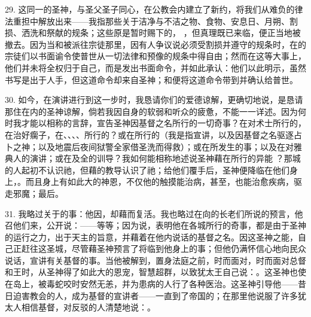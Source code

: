 29. 这同一的圣神，与圣父圣子同心，在公教会内建立了新约，将我们从难负的律法重担中解放出来——我指那些关于洁净与不洁之物、食物、安息日、月朔、割损、洒洗和祭献的规条；这些原是暂时赐下的， ，但真理既已来临，便正当地被撤去。因为当和被派往宗徒那里，因有人争议说必须受割损并遵守的规条时，在的宗徒们以书面谕令使普世从一切法律和预像的规条中得自由；然而在这等大事上，他们并未将全权归于自己，而是发出书面命令，并如此承认：他们以此明示，虽然书写是出于人手，但这道命令却来自圣神；和便将这道命令带到并确认给普世。\par

30. 如今，在演讲进行到这一步时，我恳请你们的爱德谅解，更确切地说，是恳请那住在内的圣神谅解，倘若我因自身的软弱和听众的疲惫，不能一一详述。因为何时我才能以相称的言辞，宣告圣神因基督之名所行的一切奇事？在对术士所行的，在治好瘸子，在、、、、所行的？或在所行的（我是指宣讲，以及因基督之名驱逐占卜之神；以及地震后夜间狱警全家借圣洗而得救）；或在所发生的事；以及在对雅典人的演讲；或在及全的训导？我如何能相称地述说圣神藉在所行的异能 ？那城的人起初不认识祂，但藉的教导认识了祂；给他们覆手后，圣神便降临在他们身上，。而且身上有如此大的神恩，不仅他的触摸能治病，甚至，也能治愈疾病，驱走邪魔；最后。\par

31. 我略过关于的事：他因，却藉而复活。我也略过在向的长老们所说的预言，他召他们来，公开说：——等等；因为说，表明他在各城所行的奇事，都是由于圣神的运行之力，出于天主的旨意，并藉着在他内说话的基督之名。因这圣神之能，自己正赶往这圣城，尽管藉圣神预言了将临到他身上的事；但他仍满怀信心地向民众说话，宣讲有关基督的事。当他被解到，置身法庭之前，时而面对，时而面对总督和王时，从圣神得了如此大的恩宠，智慧超群，以致犹太王自己说：。这圣神也使在岛上，被毒蛇咬时安然无恙，并为患病的人行了各种医治。这圣神引导他——昔日迫害教会的人，成为基督的宣讲者——一直到了帝国的；在那里他说服了许多犹太人相信基督，对反驳的人清楚地说：。\par

